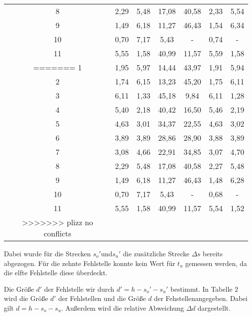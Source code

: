 \begin{table}[H]
\begin{tabular}{c c c c c c c}
    8  &  2,29 & 5,48 & 17,08 & 40,58 & 2,33 & 5,54 &   \\
    9  &  1,49 & 6,18 & 11,27 & 46,43 & 1,54 & 6,34 &   \\
    10 &  0,70 & 7,17 & 5,43  & -     & 0,74 & -    & \\
    11 &  5,55 & 1,58 & 40,99 & 11,57 & 5,59 & 1,58 &   \\
=======
    1  &  1,95 & 5,97 & 14,44 & 43,97 & 1,91 & 5,94    \\
    2  &  1,74 & 6,15 & 13,23 & 45,20 & 1,75 & 6,11    \\
    3  &  6,11 & 1,33 & 45,18 & 9,84  & 6,11 & 1,28    \\
    4  &  5,40 & 2,18 & 40,42 & 16,50 & 5,46 & 2,19    \\
    5  &  4,63 & 3,01 & 34,37 & 22,55 & 4,63 & 3,02    \\
    6  &  3,89 & 3,89 & 28,86 & 28,90 & 3,88 & 3,89    \\
    7  &  3,08 & 4,66 & 22,91 & 34,85 & 3,07 & 4,70    \\
    8  &  2,29 & 5,48 & 17,08 & 40,58 & 2,27 & 5,48    \\
    9  &  1,49 & 6,18 & 11,27 & 46,43 & 1,48 & 6,28    \\
    10 &  0,70 & 7,17 & 5,43  & -     & 0,68 & -     \\
    11 &  5,55 & 1,58 & 40,99 & 11,57 & 5,54 & 1,52    \\
>>>>>>> plizz no conflicts
    \bottomrule
  \end{tabular}
\end{table}

Dabei wurde für die Strecken $s_o' \text{und} s_u'$ die zusätzliche Strecke $\Delta s$ bereits abgezogen. Für die zehnte Fehlstelle konnte
kein Wert für $t_u$ gemessen werden, da die elfte Fehlstelle diese überdeckt.

Die Größe $d'$ der Fehlstelle wir durch $d' = h - s_o' - s_u'$ bestimmt. In Tabelle 2 wird die Größe $d'$ der Fehlstellen und die
Größe $d$ der Fehstellenangegeben. Dabei gilt $d = h - s_o - s_u$. Außerdem wird die relative Abweichung $\Delta d$ dargestellt.

